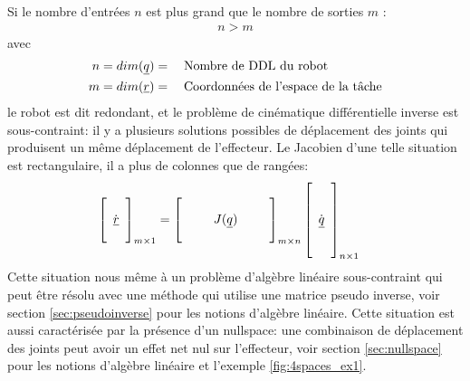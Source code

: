 Si le nombre d'entrées $n$ est plus grand que le nombre de sorties $m$ :
\begin{align}
	n > m
\end{align}
avec
\begin{align}
	n &= dim(\underline{q}) = \quad\text{Nombre de DDL du robot} \\
	m &= dim(\underline{r}) = \quad\text{Coordonnées de l'espace de la tâche}
\end{align}
le robot est dit redondant, et le problème de cinématique différentielle inverse est sous-contraint: il y a plusieurs solutions possibles de déplacement des joints qui produisent un même déplacement de l'effecteur. Le Jacobien d'une telle situation est rectangulaire, il a plus de colonnes que de rangées:
\begin{align}
	\left[ \begin{array}{c}  \\ \dot{\underline{r}} \\ \\
	\end{array} \right]_{m \times 1}
	&=
	\left[ \begin{array}{c c c c c}
			   &&&&\\
			   && J(\underline{q}) &&\\
			   &&&&
	\end{array} \right]_{m \times n}
	\left[ \begin{array}{c}
			   \\ \\ \dot{\underline{q}} \\ \\ \\
	\end{array} \right]_{n \times 1}
	\label{eq:underconstraintdiffkin}
\end{align}
Cette situation nous même à un problème d'algèbre linéaire sous-contraint qui peut être résolu avec une méthode qui utilise une matrice pseudo inverse, voir section \ref{sec:pseudoinverse} pour les notions d'algèbre linéaire. Cette situation est aussi caractérisée par la présence d'un nullspace: une combinaison de déplacement des joints peut avoir un effet net nul sur l'effecteur, voir section \ref{sec:nullspace} pour les notions d'algèbre linéaire et l'exemple \ref{fig:4spaces_ex1}.

